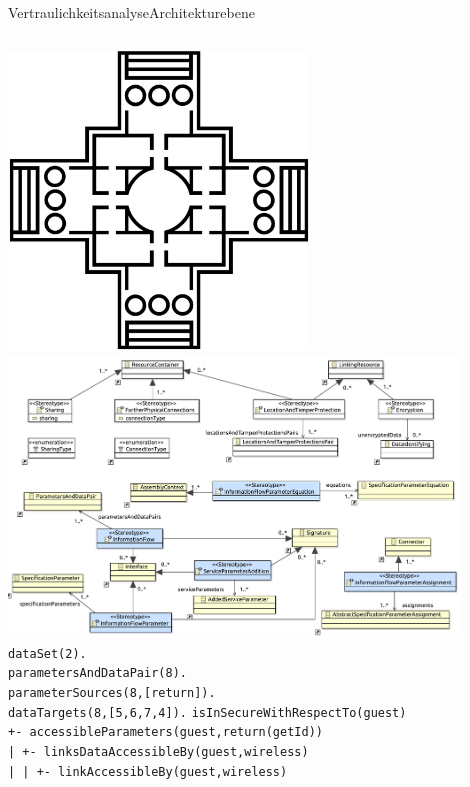 \documentclass{sdqbeamer}
\begin{document}
\begin{frame}{Vertraulichkeitsanalyse}{Architekturebene}
\begin{columns}[c]
	\centering
	\includegraphics[width=0.6\textwidth]{images/Palladio-logo.png}
	\vspace{0.05\textheight}
	\centering
	\includegraphics[width=0.9\textwidth]{images/confidentiality_profile.pdf}
	\vspace{0.05\textheight}
	\texttt{\footnotesize dataSet(2).\\
		parametersAndDataPair(8).\\
		parameterSources(8,[return]).\\
		dataTargets(8,[5,6,7,4]).}
	\texttt{\tiny isInSecureWithRespectTo(guest)\\
+- accessibleParameters(guest,return(getId))\\
| +- linksDataAccessibleBy(guest,wireless)\\
| | +- linkAccessibleBy(guest,wireless)\\
}
\end{columns}
\end{frame}
\end{document}
